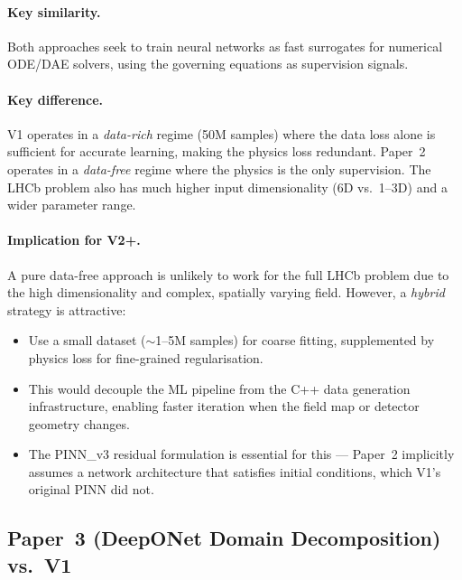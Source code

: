 \documentclass[12pt,a4paper]{article}
\begin{document}
\paragraph{Key similarity.} Both approaches seek to train neural networks as fast surrogates for numerical ODE/DAE solvers, using the governing equations as supervision signals.

\paragraph{Key difference.} V1 operates in a \emph{data-rich} regime (50M samples) where the data loss alone is sufficient for accurate learning, making the physics loss redundant. Paper~2 operates in a \emph{data-free} regime where the physics is the only supervision. The LHCb problem also has much higher input dimensionality (6D vs.\ 1--3D) and a wider parameter range.

\paragraph{Implication for V2+.} A pure data-free approach is unlikely to work for the full LHCb problem due to the high dimensionality and complex, spatially varying field. However, a \emph{hybrid} strategy is attractive:
\begin{itemize}
\item Use a small dataset (${\sim}$1--5M samples) for coarse fitting, supplemented by physics loss for fine-grained regularisation.
\item This would decouple the ML pipeline from the C++ data generation infrastructure, enabling faster iteration when the field map or detector geometry changes.
\item The PINN\_v3 residual formulation is essential for this --- Paper~2 implicitly assumes a network architecture that satisfies initial conditions, which V1's original PINN did not.
\end{itemize}

\subsection{Paper~3 (DeepONet Domain Decomposition) vs.\ V1}
\end{document}
